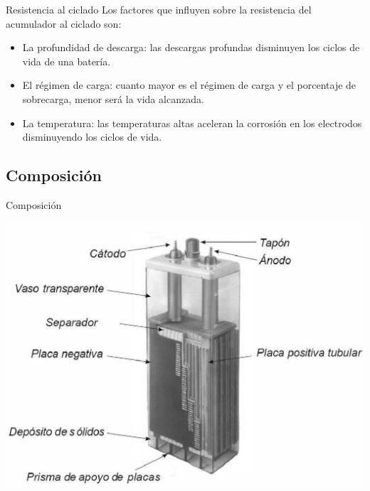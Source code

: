 \documentclass[xcolor={usenames,svgnames,dvipsnames}]{beamer}
\begin{document}
\begin{frame}[label={sec:org8cfeca5}]{Resistencia al ciclado}
Los factores que influyen sobre la resistencia del acumulador al ciclado son: 
\begin{itemize}
\item \alert{La profundidad de descarga}: las descargas profundas disminuyen los ciclos de vida de una batería.

\item \alert{El régimen de carga}: cuanto mayor es el régimen de carga y el porcentaje de sobrecarga, menor será la vida alcanzada.

\item \alert{La temperatura}: las temperaturas altas aceleran la corrosión en los electrodos disminuyendo los ciclos de vida.
\end{itemize}
\end{frame}


\subsection{Composición}
\label{sec:org896fc2c}

\begin{frame}[label={sec:org1ec3305}]{Composición}
\begin{center}
\includegraphics[width=.9\linewidth]{../figs/AcumuladorBN.pdf}
\end{center}
\end{frame}
\end{document}
